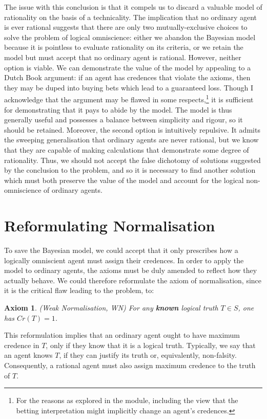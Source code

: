 \documentclass[12pt]{article}
\newtheorem{axiom}{Axiom}
\begin{document}
The issue with this conclusion is that it compels us to discard a valuable model of rationality on the basis of a technicality. The implication that no ordinary agent is ever rational suggests that there are only two mutually-exclusive choices to solve the problem of logical omniscience: either we abandon the Bayesian model because it is pointless to evaluate rationality on its criteria, or we retain the model but must accept that no ordinary agent is rational. However, neither option is viable. We can demonstrate the value of the model by appealing to a Dutch Book argument: if an agent has credences that violate the axioms, then they may be duped into buying bets which lead to a guaranteed loss.\autocite[44]{bdrc} Though I acknowledge that the argument may be flawed in some respects,\footnote{For the reasons as explored in the module, including the view that the betting interpretation might implicitly change an agent's credences.} it is sufficient for demonstrating that it pays to abide by the model. The model is thus generally useful and possesses a balance between simplicity and rigour, so it should be retained. Moreover, the second option is intuitively repulsive. It admits the sweeping generalisation that ordinary agents are never rational, but we know that they are capable of making calculations that demonstrate some degree of rationality. Thus, we should not accept the false dichotomy of solutions suggested by the conclusion to the problem, and so it is necessary to find another solution which must both preserve the value of the model and account for the logical non-omniscience of ordinary agents.

\section{Reformulating Normalisation}
To save the Bayesian model, we could accept that it only prescribes how a logically omniscient agent must assign their credences. In order to apply the model to ordinary agents, the axioms must be duly amended to reflect how they actually behave. We could therefore reformulate the axiom of normalisation, since it is the critical flaw leading to the problem, to:
\begin{axiom}
    (Weak Normalisation, WN) For any \textbf{known} logical truth $T\in S$, one has $Cr(T)=1$.
\end{axiom}
This reformulation implies that an ordinary agent ought to have maximum credence in $T$, only if they know that it is a logical truth.\autocite{sep} Typically, we say that an agent knows $T$, if they can justify its truth or, equivalently, non-falsity. Consequently, a rational agent must also assign maximum credence to the truth of $T$.
\end{document}
